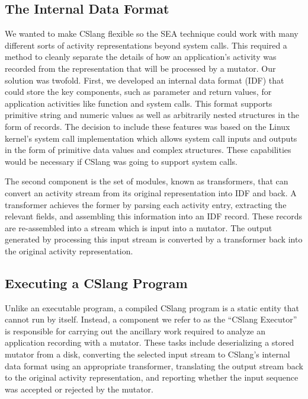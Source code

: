 \subsection{The Internal Data Format}

We wanted to make CSlang flexible
so the SEA technique
could
work with many different sorts of
activity representations beyond system calls.
This required a method to cleanly separate the details of how
an application's activity was recorded from the representation that will be
processed by a mutator.
Our solution was twofold.  First, we developed an internal data format
(IDF) that
could store the key components, such as parameter and return values,
for application activities like function
and system calls.  This format supports primitive string and numeric
values as well as arbitrarily nested structures in the form of records.
The decision to include these features
was based on the Linux kernel's system call implementation
which allows system call inputs and outputs in the form of primitive data
values and complex structures.
These capabilities would be necessary
if CSlang was going to support system calls.

The second component is the set of modules, known as transformers, that can
convert an activity stream from its original representation into IDF and
back.  A transformer achieves the former by parsing each activity entry,
extracting the relevant fields, and assembling this information into an IDF
record.  These records are re-assembled into a stream which is input into a
mutator.
The output generated by processing this input stream
is converted by a transformer
back into the original activity representation.

\subsection{Executing a CSlang Program}

Unlike an executable program, a compiled CSlang program is a static entity
that cannot run by itself.  Instead, a component we refer to as the
``CSlang Executor'' is responsible for carrying out the ancillary work
required to analyze an application recording with a mutator.
These tasks include deserializing a stored mutator from a disk,
converting the selected input stream
to CSlang's internal data format
using an appropriate transformer,
translating the output stream back to the original activity representation,
and reporting whether the input sequence was
accepted or rejected by the mutator.
